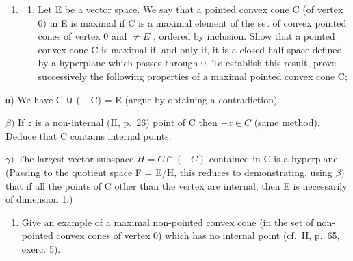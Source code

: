 \exercisegroup

\begin{enumerate}
\def\labelenumi{\arabic{enumi})}
\tightlist
\item
  \begin{enumerate}
  \def\labelenumii{\alph{enumii})}
  \tightlist
  \item
    Let E be a vector space. We say that a pointed convex cone C (of vertex 0) in E is maximal if C is a maximal element of the set of convex pointed cones of vertex 0 and \(\neq E\) , ordered by inclusion. Show that a pointed convex cone C is maximal if, and only if, it is a closed half-space defined by a hyperplane which passes through 0. To establish this result, prove successively the following properties of a maximal pointed convex cone C;
  \end{enumerate}
\end{enumerate}

α) We have C ∪ (− C) = E (argue by obtaining a contradiction).

\(\beta)\) If \(z\) is a non-internal (II, p.~26) point of C then \(-z \in C\) (same method). Deduce that C contains internal points.

\(\gamma)\) The largest vector subspace \(H = C \cap (-C)\) contained in C is a hyperplane. (Passing to the quotient space F = E/H, this reduces to demonstrating, using \(\beta)\) that if all the points of C other than the vertex are internal, then E is necessarily of dimension 1.)

\begin{enumerate}
\def\labelenumi{\alph{enumi})}
\setcounter{enumi}{1}
\tightlist
\item
  Give an example of a maximal non-pointed convex cone (in the set of non-pointed convex cones of vertex 0) which has no internal point (cf.~II, p.~65, exerc. 5).
\end{enumerate}


